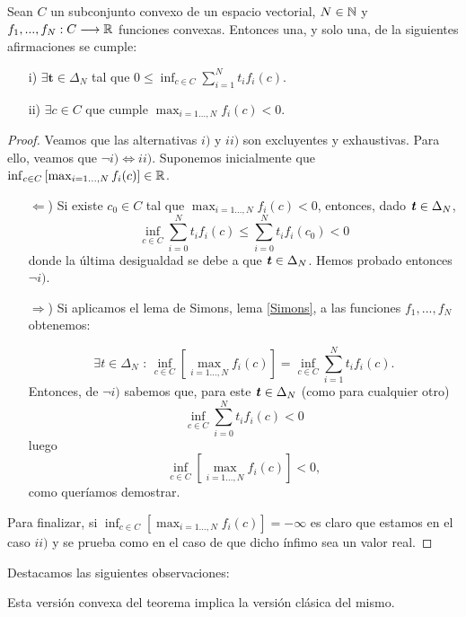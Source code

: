 \bigskip
\begin{teoremaBox}\label{Gordan}
	Sean $ C $ un subconjunto convexo de un espacio vectorial, $ N \in \mathbb{N} $ y  $ f_1,...,f_N : C \longrightarrow \mathbb{R} $ funciones convexas. Entonces una, y solo una, de la siguientes afirmaciones se cumple:
	\begin{itemize}
		\item[i)] $ \exists \mathbf{t} \in \Delta_N $ tal que $ 0 \leq \displaystyle \inf_{c\in C}  \sum_{i=1}^{N}{t_i f_i (c)}$.
		\item[ii)] $ \exists c \in C $ que cumple $\displaystyle \max_{i=1\dots,N } f_i(c) < 0 $.
	\end{itemize}
\end{teoremaBox}
\begin{proof}
	Veamos que las alternativas $ i)$ y $ ii) $ son excluyentes y exhaustivas. Para ello, veamos que $ \neg i) \Longleftrightarrow ii) $. Suponemos inicialmente que $  \inf_{ c\in C}\left[\max_{i=1\dots,N } f_i(c) \right] \in \mathbb{R} $.
	
	\begin{itemize}
		\item [$ \Leftarrow $)] Si existe $ c_0 \in C $ tal que $ \max_{i=1\dots,N } f_i(c) < 0 $, entonces, dado $ \textbf{\emph{t}} \in \Delta_N $,
		\[
		\inf_{ c \in C} \sum_{i=0}^{N}t_i f_i(c) \leq \sum_{i=0}^{N}t_i f_i(c_0) < 0
		\]
		donde la última desigualdad se debe a que $ \textbf{\emph{t}} \in \Delta_N $. Hemos probado entonces $ \neg i) $.
		\item[$ \Rightarrow $)] 	Si aplicamos el lema de Simons, lema \ref{Simons}, a las funciones $ f_1,...,f_N $ obtenemos:
		
		\begin{equation*}
		\exists t \in \Delta_N \text{ : } \inf_{ c\in C}\left[\max_{i=1\dots,N } f_i(c) \right] = \inf_{c \in C} \sum_{i=1}^{N}t_i f_i (c).
		\end{equation*}
		Entonces, de $ \neg i) $ sabemos que, para este $ \textbf{\emph{t}} \in \Delta_N $ (como para cualquier otro)
		\[
		\inf_{ c \in C} \sum_{i=0}^{N}t_i f_i(c) < 0
		\]
		luego
		\[
		\inf_{ c\in C}\left[\max_{i=1\dots,N } f_i(c) \right] < 0,
		\]
		como queríamos demostrar.
		
	\end{itemize}
	
	Para finalizar, si $  \inf_{ c\in C}\left[\max_{i=1\dots,N } f_i(c) \right] =-\infty $ es claro que estamos en el caso $ ii) $ y se prueba como en el caso de que dicho ínfimo sea un valor real.
\end{proof}
\bigskip
Destacamos las siguientes observaciones:
\bigskip
\begin{observacion}
	Esta versión convexa del teorema implica la versión clásica del mismo.
\end{observacion}


